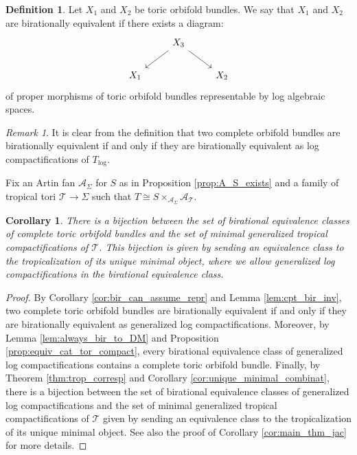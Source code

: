 \documentclass[11pt]{amsart}
\newtheorem{corollary}[theorem]{Corollary}
\theoremstyle{definition}
\newtheorem{definition}[theorem]{Definition}
\theoremstyle{remark}
\newtheorem{remark}[theorem]{Remark}
\def\log{\mathrm{log}}
\begin{document}
\begin{definition}
	Let $X_1$ and $X_2$ be toric orbifold bundles. We say that $X_1$ and $X_2$ are birationally equivalent if there
	exists a diagram:
	$$\begin{tikzcd}
		&X_3\arrow[dr]\arrow[dl]&\\
		X_1&&X_2
	\end{tikzcd}$$
	of proper morphisms of toric orbifold bundles
	representable by log algebraic spaces.
\end{definition}

\begin{remark}
	It is clear from the definition that two complete orbifold bundles are
	birationally equivalent if and only if they are birationally
	equivalent as log compactifications of $T_{\log}$.
\end{remark}

Fix an Artin fan $\mathcal{A}_{\Sigma}$ for $S$ as in Proposition \ref{prop:A_S_exists} and a
family of tropical tori $\mathcal{T}\to \Sigma$ such that $T\cong S\times_{\mathcal{A}_{\Sigma}}\mathcal{A}_{\mathcal{T}}$.

\begin{corollary}
	\label{cor:main_thm_tor}
	There is a bijection between the set of birational equivalence classes of complete toric orbifold bundles
	and the set of minimal generalized tropical compactifications of $\mathcal{T}$. This bijection is given by sending
	an equivalence class to the tropicalization of its unique minimal object, where we allow generalized log
	compactifications in the birational equivalence class.
\end{corollary}

\begin{proof}
	By Corollary \ref{cor:bir_can_assume_repr} and Lemma \ref{lem:cpt_bir_inv},
	two complete toric orbifold bundles are birationally equivalent if and
	only if they are birationally equivalent as generalized log compactifications. Moreover, by Lemma \ref{lem:always_bir_to_DM} and Proposition \ref{prop:equiv_cat_tor_compact},
	every birational equivalence class of generalized log compactifications contains a complete toric orbifold bundle.
	Finally, by Theorem \ref{thm:trop_corresp} and Corollary \ref{cor:unique_minimal_combinat}, there is a bijection between the set of birational equivalence
	classes of generalized log compactifications and the set of minimal generalized tropical compactifications of $\mathcal{T}$
	given by sending an equivalence class to the tropicalization of its unique minimal object. See also the proof of Corollary \ref{cor:main_thm_jac}
	for more details.
\end{proof}
\end{document}
